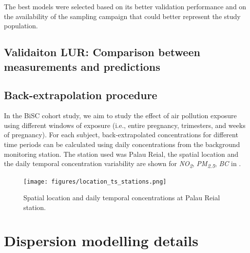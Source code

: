 \documentclass{article}
\begin{document}
The best models were selected based on its better validation performance and on the availability of the sampling campaign that could better represent the study population. 

\subsection{Validaiton LUR: Comparison between measurements and predictions}



\newpage
\subsection{Back-extrapolation procedure}

In the BiSC cohort study, we aim to study the effect of air pollution exposure using different windows of exposure (i.e., entire pregnancy, trimesters, and weeks of pregnancy). For each subject, back-extrapolated concentrations for different time periods can be calculated using daily concentrations from the background monitoring station. The station used was Palau Reial, the spatial location and the daily temporal concentration variability are shown for \textit{NO\textsubscript{2}}, \textit{PM\textsubscript{2.5}}, \textit{BC} in \textbf{}.


\renewcommand{\thefigure}{S\arabic{figure}}

\captionsetup[figure]{skip=6pt} %
\begin{figure}[!htb]
    \centering
    \texttt{[image: figures/location\_ts\_stations.png]} %
    \caption{Spatial location and daily temporal concentrations at Palau Reial station.}
    \label{FigureS1} %
\end{figure}



\newpage


\section{Dispersion modelling details}
\end{document}
